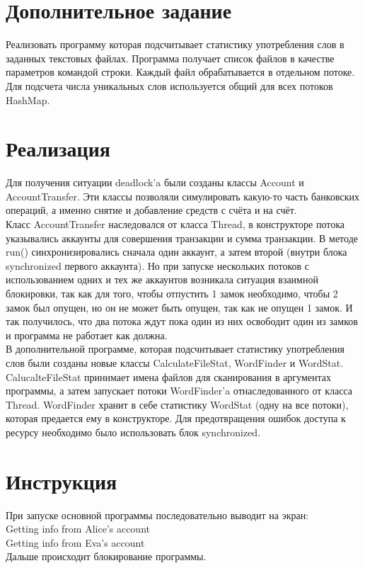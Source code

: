 \documentclass{article}
\begin{document}
\section{Дополнительное задание}
Реализовать программу которая подсчитывает статистику употребления слов в заданных текстовых файлах. Программа получает список файлов в качестве параметров командой строки. Каждый файл обрабатывается в отдельном потоке. Для подсчета числа уникальных слов используется общий для всех потоков HashMap.

\section{Реализация}
Для получения ситуации deadlock'a были созданы классы Account и AccountTransfer. Эти классы позволяли симулировать какую-то часть банковских операций, а именно снятие и добавление средств с счёта и на счёт. \\

Класс AccountTransfer наследовался от класса Thread, в конструкторе потока указывались аккаунты для совершения транзакции и сумма транзакции. В методе run() синхронизировались сначала один аккаунт, а затем второй (внутри блока synchronized первого аккаунта). Но при запуске нескольких потоков с использованием одних и тех же аккаунтов возникала ситуация взаимной блокировки, так как для того, чтобы отпустить 1 замок необходимо, чтобы 2 замок был опущен, но он не может быть опущен, так как не опущен 1 замок. И так получилось, что два потока ждут пока один из них освободит один из замков и программа не работает как должна. \\

В дополнительной программе, которая подсчитывает статистику употребления слов были созданы новые классы CalculateFileStat, WordFinder и WordStat. \\

CalucalteFileStat принимает имена файлов для сканирования в аргументах программы, а затем запускает потоки WordFinder'a отнаследованного от класса Thread. WordFinder хранит в себе статистику WordStat (одну на все потоки), которая предается ему в конструкторе. Для предотвращения ошибок доступа к ресурсу необходимо было использовать блок synchronized. 


\section{Инструкция}
При запуске основной программы последовательно выводит на экран:\\
Getting info from Alice's account\\
Getting info from Eva's account\\
Дальше происходит блокирование программы.
\end{document}
